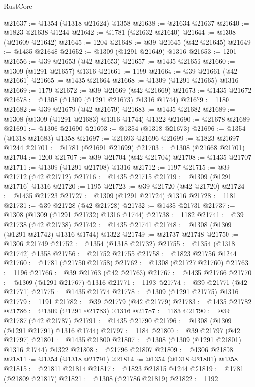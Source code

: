 \begin{lexlean}{RustCore}
\begin{coremodule}
@21637 := @1354 (@1318 @21624) @1358
@21638 := @21634 @21637
@21640 := @1823 @21638 @1244
@21642 := @1781 (@21632 @21640)
@21644 := @1308 (@21609 @21642)
@21645 := 1204
@21648 := @39 @21645 (@42 @21645)
@21649 := @1435 @21648
@21652 := @1309 (@1291 @21649) @1316
@21653 := 1201
@21656 := @39 @21653 (@42 @21653)
@21657 := @1435 @21656
@21660 := @1309 (@1291 @21657) @1316
@21661 := 1199
@21664 := @39 @21661 (@42 @21661)
@21665 := @1435 @21664
@21668 := @1309 (@1291 @21665) @1316
@21669 := 1179
@21672 := @39 @21669 (@42 @21669)
@21673 := @1435 @21672
@21678 := @1308 (@1309 (@1291 @21673) @1316 @1744)
@21679 := 1180
@21682 := @39 @21679 (@42 @21679)
@21683 := @1435 @21682
@21689 := @1308 (@1309 (@1291 @21683) @1316 @1744) @1322
@21690 := @21678 @21689
@21691 := @1306 @21690
@21693 := @1354 (@1318 @21673)
@21696 := @1354 (@1318 @21683) @1358
@21697 := @21693 @21696
@21699 := @1823 @21697 @1244
@21701 := @1781 (@21691 @21699)
@21703 := @1308 (@21668 @21701)
@21704 := 1200
@21707 := @39 @21704 (@42 @21704)
@21708 := @1435 @21707
@21711 := @1309 (@1291 @21708) @1316
@21712 := 1197
@21715 := @39 @21712 (@42 @21712)
@21716 := @1435 @21715
@21719 := @1309 (@1291 @21716) @1316
@21720 := 1195
@21723 := @39 @21720 (@42 @21720)
@21724 := @1435 @21723
@21727 := @1309 (@1291 @21724) @1316
@21728 := 1181
@21731 := @39 @21728 (@42 @21728)
@21732 := @1435 @21731
@21737 := @1308 (@1309 (@1291 @21732) @1316 @1744)
@21738 := 1182
@21741 := @39 @21738 (@42 @21738)
@21742 := @1435 @21741
@21748 := @1308 (@1309 (@1291 @21742) @1316 @1744) @1322
@21749 := @21737 @21748
@21750 := @1306 @21749
@21752 := @1354 (@1318 @21732)
@21755 := @1354 (@1318 @21742) @1358
@21756 := @21752 @21755
@21758 := @1823 @21756 @1244
@21760 := @1781 (@21750 @21758)
@21762 := @1308 (@21727 @21760)
@21763 := 1196
@21766 := @39 @21763 (@42 @21763)
@21767 := @1435 @21766
@21770 := @1309 (@1291 @21767) @1316
@21771 := 1193
@21774 := @39 @21771 (@42 @21771)
@21775 := @1435 @21774
@21778 := @1309 (@1291 @21775) @1316
@21779 := 1191
@21782 := @39 @21779 (@42 @21779)
@21783 := @1435 @21782
@21786 := @1309 (@1291 @21783) @1316
@21787 := 1183
@21790 := @39 @21787 (@42 @21787)
@21791 := @1435 @21790
@21796 := @1308 (@1309 (@1291 @21791) @1316 @1744)
@21797 := 1184
@21800 := @39 @21797 (@42 @21797)
@21801 := @1435 @21800
@21807 := @1308 (@1309 (@1291 @21801) @1316 @1744) @1322
@21808 := @21796 @21807
@21809 := @1306 @21808
@21811 := @1354 (@1318 @21791)
@21814 := @1354 (@1318 @21801) @1358
@21815 := @21811 @21814
@21817 := @1823 @21815 @1244
@21819 := @1781 (@21809 @21817)
@21821 := @1308 (@21786 @21819)
@21822 := 1192

\end{coremodule}
\end{lexlean}
